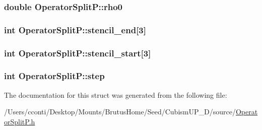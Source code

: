 \subsubsection[{rho0}]{\setlength{\rightskip}{0pt plus 5cm}double Operator\+Split\+P\+::rho0}\label{struct_operator_split_p_a3ac24a890985abf7a9aacbd5dd6eb793}
\hypertarget{struct_operator_split_p_a95a4b7a553633934a6fd9b293f340163}{}
\subsubsection[{stencil\+\_\+end}]{\setlength{\rightskip}{0pt plus 5cm}int Operator\+Split\+P\+::stencil\+\_\+end\mbox{[}3\mbox{]}}\label{struct_operator_split_p_a95a4b7a553633934a6fd9b293f340163}
\hypertarget{struct_operator_split_p_aefdeb53904b6203f60aaf16f0f86c5c7}{}
\subsubsection[{stencil\+\_\+start}]{\setlength{\rightskip}{0pt plus 5cm}int Operator\+Split\+P\+::stencil\+\_\+start\mbox{[}3\mbox{]}}\label{struct_operator_split_p_aefdeb53904b6203f60aaf16f0f86c5c7}
\hypertarget{struct_operator_split_p_a0ecf20a65e1c44eb54de490c9db4e177}{}
\subsubsection[{step}]{\setlength{\rightskip}{0pt plus 5cm}int Operator\+Split\+P\+::step}\label{struct_operator_split_p_a0ecf20a65e1c44eb54de490c9db4e177}


The documentation for this struct was generated from the following file\+:\begin{DoxyCompactItemize}
\item 
/\+Users/cconti/\+Desktop/\+Mounts/\+Brutus\+Home/\+Seed/\+Cubism\+U\+P\+\_\+D/source/\hyperlink{_operator_split_p_8h}{Operator\+Split\+P.\+h}\end{DoxyCompactItemize}

